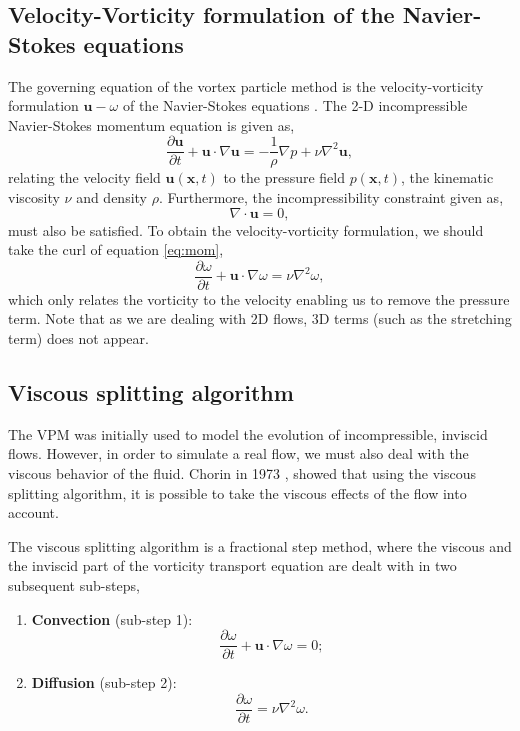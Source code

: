  
\subsection{Velocity-Vorticity formulation of the Navier-Stokes equations}
The governing equation of the vortex particle method is the velocity-vorticity formulation $\mathbf{u}-\omega$ of the Navier-Stokes equations \cite{Cottet2000a}. The 2-D incompressible Navier-Stokes momentum equation is given as,
	\begin{equation}
	\frac{\partial \mathbf{u}}{\partial t} + \mathbf{u}\cdot\nabla\mathbf{u} = - \frac{1}{\rho} \nabla p + \nu \nabla^2\mathbf{u},
	\label{eq:mom}
	\end{equation}
relating the velocity field $\mathbf{u}\left(\mathbf{x},t\right)$ to the pressure field $p\left(\mathbf{x},t\right)$, the kinematic viscosity $\nu$ and density $\rho$. Furthermore, the incompressibility constraint given as,
	\begin{equation}
	\nabla\cdot\mathbf{u} = 0,
	\label{eq:la_ic}
	\end{equation}
must also be satisfied. To obtain the velocity-vorticity formulation, we should take the curl of equation \ref{eq:mom}, 
	\begin{equation}
	\frac{\partial \omega}{\partial t} + \mathbf{u}\cdot\nabla\omega = \nu \nabla^2 \omega,
	\end{equation}
which only relates the vorticity to the velocity enabling us to remove the pressure term. Note that as we are dealing with 2D flows, 3D terms (such as the stretching term) does not appear.

\subsection{Viscous splitting algorithm}
The VPM was initially used to model the evolution of incompressible, inviscid flows. However, in order to simulate a real flow, we must also deal with the viscous behavior of the fluid. Chorin in 1973 \cite{Chorin1973a}, showed that using the viscous splitting algorithm, it is possible to take the viscous effects of the flow into account. 

The viscous splitting algorithm is a fractional step method, where the viscous and the inviscid part of the vorticity transport equation are dealt with in two subsequent sub-steps, 

	\begin{enumerate}
	\item \textbf{Convection} (sub-step 1):
		\begin{equation}
		\frac{\partial\omega}{\partial t} + \mathbf{u}\cdot\nabla\omega=0;
		\label{eq:convectionEulerian}
		\end{equation}
		
	\item \textbf{Diffusion} (sub-step 2):
		\begin{equation}
		\frac{\partial\omega}{\partial t} = \nu\nabla^2\omega.
		\label{eq:vsa2}
		\end{equation}
	\end{enumerate}

